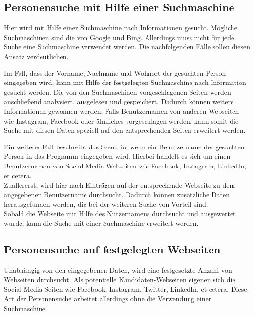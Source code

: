 	\subsection{Personensuche mit Hilfe einer Suchmaschine}
	\label{subsubsec:PersonensucheMitHilfevonSuchmaschine}
	Hier wird mit Hilfe einer Suchmaschine nach Informationen gesucht. Mögliche Suchmaschinen sind die von Google und Bing. Allerdings muss nicht für jede Suche eine Suchmaschine verwendet werden. Die nachfolgenden Fälle sollen diesen Ansatz verdeutlichen.
	
	Im Fall, dass der Vorname, Nachname und Wohnort der gesuchten Person eingegeben wird, kann mit Hilfe der festgelegten Suchmaschine nach Information gesucht werden. Die von den Suchmaschinen vorgeschlagenen Seiten werden anschließend analysiert, ausgelesen und gespeichert. Dadurch können weitere Informationen gewonnen werden. Falls Benutzernamen von anderen Webseiten wie Instagram, Facebook oder ähnliches vorgeschlagen werden, kann somit die Suche mit diesen Daten speziell auf den entsprechenden Seiten erweitert werden.
	
	Ein weiterer Fall beschreibt das Szenario, wenn ein Benutzername der gesuchten Person in das Programm eingegeben wird. Hierbei handelt es sich um einen Benutzernamen von Social-Media-Webseiten wie Facebook, Instagram, LinkedIn, et cetera. \\
	Zuallererst, wird hier nach Einträgen auf der entsprechende Webseite zu dem angegebenen Benutzername durchsucht. Dadurch können zusätzliche Daten herausgefunden werden, die bei der weiteren Suche von Vorteil sind.\\
	Sobald die Webseite mit Hilfe des Nutzernamens durchsucht und ausgewertet wurde, kann die Suche mit einer Suchmaschine erweitert werden.
	
	\subsection{Personensuche auf festgelegten Webseiten}
	\label{subsubsec:PersonensucheohneSuchmaschine}
	Unabhängig von den eingegebenen Daten, wird eine festgesetzte Anzahl von Webseiten durchsucht. Als potentielle Kandidaten-Webseiten eigenen sich die Social-Media-Seiten wie Facebook, Instagram, Twitter, LinkedIn, et cetera. Diese Art der Personensuche arbeitet allerdings ohne die Verwendung einer Suchmaschine.
	
